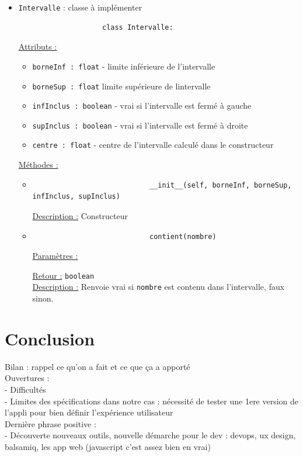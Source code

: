 \begin{itemize}
			\item  \lstinline!Intervalle! : classe à implémenter
				\begin{lstlisting}
					class Intervalle:
				\end{lstlisting}
				\underline{Attributs :}
					\begin{itemize}
						\item \lstinline!borneInf : float! - limite inférieure de l'intervalle
						\item \lstinline!borneSup : float! limite supérieure de lintervalle
						\item \lstinline!infInclus : boolean! - vrai si l'intervalle est fermé à gauche
						\item \lstinline!supInclus : boolean! - vrai si l'intervalle est fermé à droite
						\item \lstinline!centre : float! - centre de l'intervalle calculé dans le constructeur
					\end{itemize}
				\underline{Méthodes :}
					\begin{itemize}
						\vspace{1em}\item
						\begin{lstlisting}
							__init__(self, borneInf, borneSup, infInclus, supInclus)
						\end{lstlisting}
						\underline{Description :} Constructeur
						
						\vspace{1em}\item
						\begin{lstlisting}
							contient(nombre)
						\end{lstlisting}
						\underline{Paramètres :}
							\begin{description}[style=unboxed,leftmargin=0.2cm]
								\item \lstinline!nombre : float!
							\end{description}
						\underline{Retour :} \lstinline!boolean!\\
						\underline{Description :} Renvoie vrai si \lstinline!nombre! est contenu dans l'intervalle, faux sinon.
					\end{itemize}
 		\end{itemize}
	
	\section*{Conclusion}
		Bilan : rappel ce qu'on a fait et ce que ça a apporté\\
		Ouvertures :\\
			- Difficultés\\
			- Limites des spécifications dans notre cas : nécessité de tester une 1ere version de l'appli pour bien définir l'expérience utilisateur\\
		Dernière phrase positive :\\
			- Découverte nouveaux outils, nouvelle démarche pour le dev : devops, ux design, balsamiq, les app web (javascript c'est assez bien en vrai)
		

